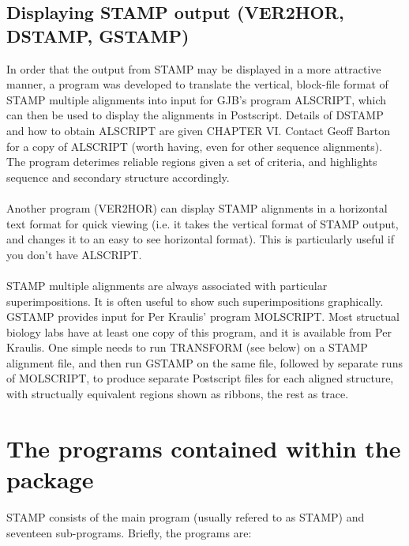 \subsection{Displaying STAMP output (VER2HOR, DSTAMP, GSTAMP)}

In order that the output from STAMP may be displayed in a more 
attractive manner, a program was developed to translate the
vertical, block-file format of STAMP multiple alignments into input
for GJB's program ALSCRIPT, which can then be used to display the
alignments in Postscript.  Details of DSTAMP and how to obtain
ALSCRIPT are given CHAPTER VI.  Contact Geoff Barton for a copy of
ALSCRIPT (worth having, even for other sequence alignments).
The program deterimes reliable regions given a set of criteria, and
highlights sequence and secondary structure accordingly.\\
\\
Another program (VER2HOR) can display STAMP alignments in a horizontal text
format for quick viewing (i.e. it takes the vertical format of STAMP output, and
changes it to an easy to see horizontal format).
This is particularly useful if you don't have ALSCRIPT.\\
\\
STAMP multiple alignments are always associated with particular
superimpositions.  It is often useful to show such superimpositions
graphically.  GSTAMP provides input for Per
Kraulis' program MOLSCRIPT.  Most structual biology labs have at
least one copy of this program, and it is available from Per
Kraulis.  One simple needs to run TRANSFORM (see below) on a STAMP
alignment file, and then run GSTAMP on the same file, followed by
separate runs of MOLSCRIPT, to produce separate Postscript files
for each aligned structure, with structually equivalent regions
shown as ribbons, the rest as \Cal trace.

\section{The programs contained within the package}

STAMP consists of the main program (usually refered to as STAMP)
and seventeen  sub-programs.  Briefly, the programs are:\\


